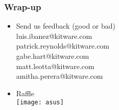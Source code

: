 \documentclass[18pt]{beamer}
\begin{document}














\begin{frame}
\frametitle{Wrap-up}
\begin{itemize}
\item Send us feedback (good or bad) \\
luis.ibanez@kitware.com \\
patrick.reynolds@kitware.com \\
gabe.hart@kitware.com \\
matt.leotta@kitware.com \\
amitha.perera@kitware.com
\item Raffle\\
\texttt{[image: asus]}
\end{itemize}
\end{frame}
\end{document}

